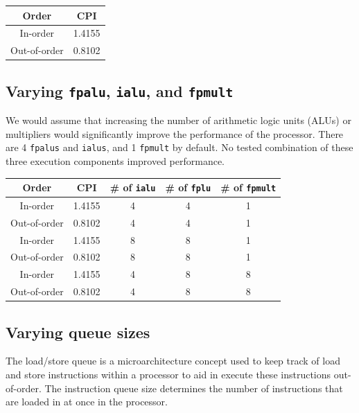 \documentclass[twocolumn]{article}
\newcommand{\cc}[1]{\texttt{#1}}
\begin{document}
\begingroup
    \medskip
    \centering
    \def\arraystretch{1.5}
        \begin{tabular}{cc}
            \toprule
            Order & CPI\\
             \midrule
            In-order & 1.4155\\
            Out-of-order & 0.8102\\
            \bottomrule
        \end{tabular}
    \label{table:btb}
\endgroup

\subsection{Varying \cc{fpalu}, \cc{ialu}, and \cc{fpmult}}

We would assume that increasing the number of arithmetic logic units (ALUs) or multipliers would significantly improve the performance of the processor. There are 4 \cc{fpalus} and \cc{ialus}, and 1 \cc{fpmult} by default. No tested combination of these three execution components improved performance.

\begingroup
    \medskip
    \centering
    \def\arraystretch{1.5}
        \begin{tabular}{ccccc}
            \toprule
            Order & CPI & # of \cc{ialu} & # of \cc{fplu} & # of \cc{fpmult}\\
             \midrule
            In-order & 1.4155 & 4 & 4 & 1\\
            Out-of-order & 0.8102 & 4 & 4 & 1\\
            \midrule
            In-order & 1.4155 & 8 & 8 & 1\\
            Out-of-order & 0.8102 & 8 & 8 & 1\\
            \midrule
            In-order & 1.4155 & 4 & 8 & 8\\
            Out-of-order & 0.8102 & 4 & 8 & 8\\
            \bottomrule
        \end{tabular}
    \label{table:btb}
\endgroup

\subsection{Varying queue sizes}

The load/store queue is a microarchitecture concept used to keep track of load and store instructions within a processor to aid in execute these instructions out-of-order. The instruction queue size determines the number of instructions that are loaded in at once in the processor. 
\end{document}
